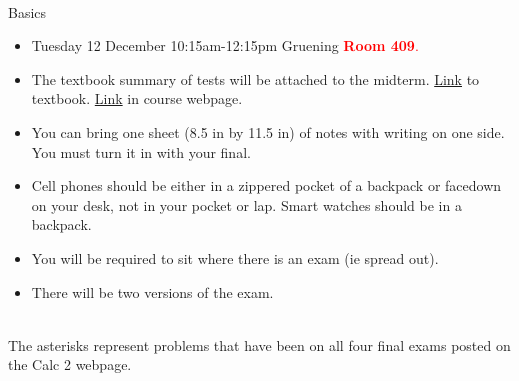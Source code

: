 \documentclass[11pt,fleqn]{article}
\begin{document}
\renewcommand{\headrulewidth}{0pt}
\newcommand{\blank}[1]{\rule{#1}{0.75pt}}
\newcommand{\bc}{\begin{center}}
\newcommand{\ec}{\end{center}}
\renewcommand{\d}{\displaystyle}

\vspace*{-0.7in}

\begin{center}
  \large
  \\
   
\end{center}
{\Large{Basics}}\\

\begin{itemize}
\item Tuesday 12 December 10:15am-12:15pm Gruening \textcolor{red}{\textbf{Room 409}.}
\item The textbook summary of tests will be attached to the midterm. \href{https://openstax.org/books/calculus-volume-2/pages/5-6-ratio-and-root-tests}{Link} to textbook. \href{https://uaf-math251.github.io/calc2/assets/worksheets/F23/convsummary.pdf}{Link} in course webpage.
\item You can bring one sheet (8.5 in by 11.5 in) of notes with writing on one side. You must turn it in with your final.
\item Cell phones should be either in a zippered pocket of a backpack or facedown on your desk, not in your pocket or lap. Smart watches should be in a backpack.
\item You will be required to sit where there is an exam (ie spread out).
\item There will be two versions of the exam.\\
\end{itemize}

\\

The asterisks represent problems that have been on all four final exams posted on the Calc 2 webpage.
\end{document}

